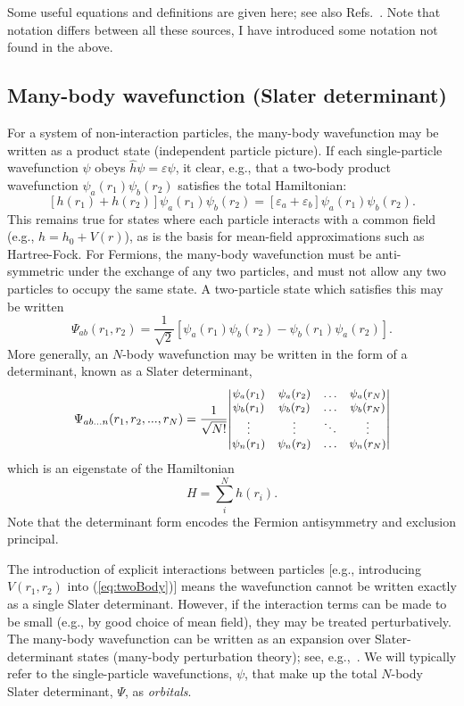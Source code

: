 \documentclass[10pt,twocolumn,a4paper]{article}%
\newcommand{\be}{\begin{equation}}
\newcommand{\ee}{\end{equation}}
\def\en{\ensuremath{\varepsilon}}
\begin{document}
Some useful equations and definitions are given here; see also Refs.~\cite{LLVol3,JohnsonBook2007,Sobelman1992,Varshalovich1988,Lindgren1986,Sapirstein1998,DzubaHFS1984}.
Note that notation differs between all these sources, I have introduced some notation not found in the above.

\subsection{Many-body wavefunction (Slater determinant)}\label{sec:ManyBodyWavefunction}

For a system of non-interaction particles, the  many-body wavefunction may be written as a product state
(independent particle picture).
If each single-particle wavefunction $\psi$ obeys $\hat h\psi=\en\psi$, it clear, e.g., that a two-body product wavefunction $\psi_a(r_1)\psi_b(r_2)$ satisfies the total Hamiltonian:
\be\label{eq:twoBody}
\left[h(r_1)+h(r_2)\right]\psi_a(r_1)\psi_b(r_2) = \left[\en_a+\en_b\right]\psi_a(r_1)\psi_b(r_2).
\ee
This remains true for states where each particle interacts with a common field (e.g., $h = h_0 + V(r)$), as is the basis for mean-field approximations such as Hartree-Fock.
For Fermions, the many-body wavefunction must be anti-symmetric under the exchange of any two particles, and must not allow any two particles to occupy the same state.
A two-particle state which satisfies this may be written
\be
\Psi_{ab}(r_1, r_2) = \frac{1}{\sqrt{2}}\left[ \psi_a(r_1)\psi_b(r_2) - \psi_b(r_1)\psi_a(r_2) \right].
\ee
More generally, an $N$-body wavefunction may be written in the form of a determinant, known as a Slater determinant,
\be
\Psi_{ab...n}(r_1, r_2,..., r_N) =
\frac{1}{\sqrt{N!}} {\small\begin{vmatrix}  
\psi_a(r_1) & \psi_a(r_2) & \ldots & \psi_a(r_N)\\ 
\psi_b(r_1) & \psi_b(r_2) & \ldots & \psi_b(r_N)\\ 
\vdots & \vdots & \ddots & \vdots \\
\psi_n(r_1) & \psi_n(r_2) & \ldots & \psi_n(r_N)
\end{vmatrix}}
\ee
which is an eigenstate of the Hamiltonian
\[
H = \sum_{i}^N h(r_i).
\]
Note that the determinant form encodes the Fermion antisymmetry and exclusion principal.

The introduction of explicit interactions between particles [e.g., introducing $V(r_1,r_2)$ into (\ref{eq:twoBody})] means the wavefunction cannot be written exactly as a single Slater determinant.
However, if the interaction terms can be made to be small (e.g., by good choice of mean field), they may be treated perturbatively.
The many-body wavefunction can be written as an expansion over Slater-determinant states (many-body perturbation theory); see, e.g.,~\cite{JohnsonBook2007,Lindgren1986}.
We will typically refer to the single-particle wavefunctions, $\psi$, that make up the total $N$-body Slater determinant, $\Psi$, as {\em orbitals}.
\end{document}
